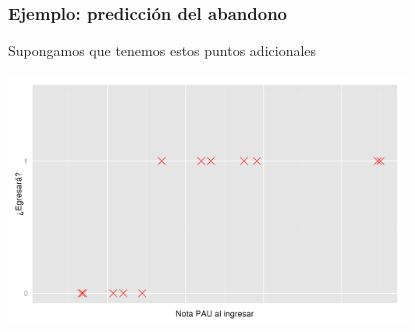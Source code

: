 \documentclass{beamer}
\begin{document}
 \begin{frame}\frametitle{Ejemplo: predicción del abandono}
   \begin{overlayarea}{\textwidth}{0.6cm} 
   Supongamos que tenemos estos puntos adicionales
   \end{overlayarea}
\begin{center}
  \includegraphics[height=6.6cm]{egresara9.png}
\end{center}
   
 \end{frame}
 
\end{document}
